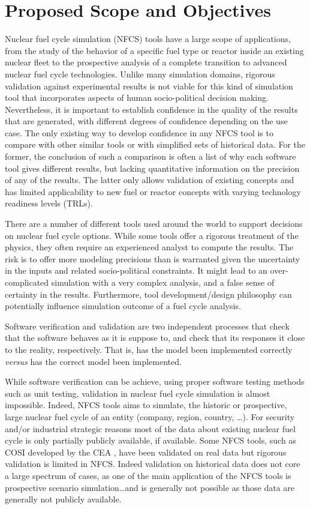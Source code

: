 \section{Proposed Scope and Objectives}

Nuclear fuel cycle simulation (NFCS) tools have a large scope of applications,
from the study of the behavior of a specific fuel type or reactor inside an
existing nuclear fleet to the prospective analysis of a complete transition to
advanced nuclear fuel cycle technologies. Unlike many simulation domains,
rigorous validation against experimental results is not viable for this kind of
simulation tool that incorporates aspects of human socio-political decision
making. Nevertheless, it is important to establish confidence in the quality of
the results that are generated, with different degrees of confidence depending
on the use case. The only existing way to develop confidence in any NFCS tool
is to compare with other similar tools or with simplified sets of historical
data. For the former, the conclusion of such a comparison is often a list of why
each software tool gives different results, but lacking quantitative information
on the precision of any of the results. The latter only allows validation of
existing concepts and has limited applicability to new fuel or reactor concepts
with varying technology readiness levels (TRLs).

There are a number of different tools used around the world to support decisions
on nuclear fuel cycle options. While some tools offer a rigorous treatment of
the physics, they often require an experienced analyst to compute the results.
The risk is to offer more modeling precisions than is warranted given the
uncertainty in the inputs and related socio-political constraints. It might lead
to an over-complicated simulation with a very complex analysis, and a false
sense of certainty in the results. Furthermore, tool development/design
philosophy can potentially influence simulation outcome of a fuel cycle
analysis.

Software verification and validation are two independent processes that
check that the software behaves as it is suppose to, and 
check that its responses it close to the reality, respectively.  That is,
has the model been implemented correctly \emph{versus} has the correct
model been implemented.

While software verification can be achieve, using proper software testing
methods such as unit testing, validation in nuclear fuel cycle
simulation is almost impossible. Indeed, NFCS tools aims to simulate, the
historic or prospective, large nuclear fuel cycle of an entity (company, region,
country, \ldots). For security and/or industrial strategic reasons most
of the data about existing nuclear fuel cycle is only partially publicly
available, if available.
Some NFCS tools, such as COSI developed by the CEA \cite{COSI6 - Coquelet}, have
been validated on real data but rigorous validation is limited in NFCS. Indeed
validation on historical data does not core a large spectrum of cases, as one of the main
application of the NFCS tools is prospective scenario simulation\ldots and is
generally not possible as those data are generally not publicly available.

